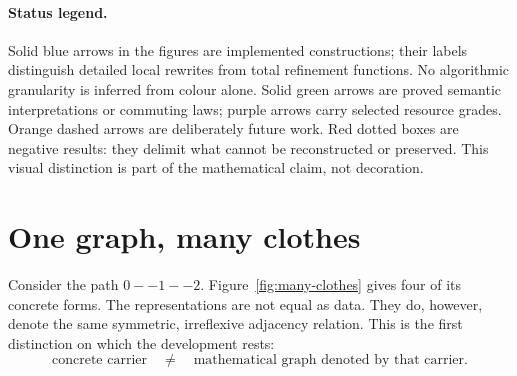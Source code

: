 \documentclass[11pt]{article}
\theoremstyle{remark}
\begin{document}
\begin{abstract}
The theory includes positive and negative examples for six ordinary graph
representations; exact refinement maps through a canonical matrix waist; the
first occurrence-level conversion GSLT; semantic machines for revision and
querying; a bridge to ordinary Mathlib
matrices; break-even theorems for migration and maintained multi-view
channels; worked query-centric, edge-centric, revision-heavy, and
space-constrained migration decisions; semantic queries for hypergraphs,
enriched metagraphs, and
distinction graphs; and transport of connectedness, bipartiteness, acyclicity,
degree, and Hamiltonicity.  Ore's and Dirac's theorems are proved over
Mathlib's graph semantics and then transported through every representation
conversion.  A work-in-progress appendix marks the later arrows: detailed
matrix-to-row and row-to-CSR machines, walk cancellation and incremental
trail/path admission, the raw-pattern no-junk theorem, an exact executable
syntax and elaborator, certified SAT/DQBF refinement, and a CeTTa runtime
realization.
The result is both a graph library and a worked
example of how a mathematical library can expose operational meaning without
confusing data layout, semantics, provenance, and cost.
\end{abstract}

\paragraph{Status legend.}
Solid blue arrows in the figures are implemented constructions; their labels
distinguish detailed local rewrites from total refinement functions.  No
algorithmic granularity is inferred from colour alone.  Solid green arrows are
proved semantic interpretations or commuting laws; purple arrows carry
selected resource grades.  Orange dashed arrows are deliberately future work.
Red dotted boxes are negative results: they delimit what cannot be
reconstructed or preserved.  This visual distinction is part of the
mathematical claim, not decoration.

\tableofcontents

\section{One graph, many clothes}
\label{sec:many-clothes}

Consider the path \(0--1--2\).  Figure~\ref{fig:many-clothes} gives four of
its concrete forms.  The representations are not equal as data.  They do,
however, denote the same symmetric, irreflexive adjacency relation.  This is
the first distinction on which the development rests:
\[
  \text{concrete carrier} \quad\neq\quad
  \text{mathematical graph denoted by that carrier}.
\]
\end{document}
